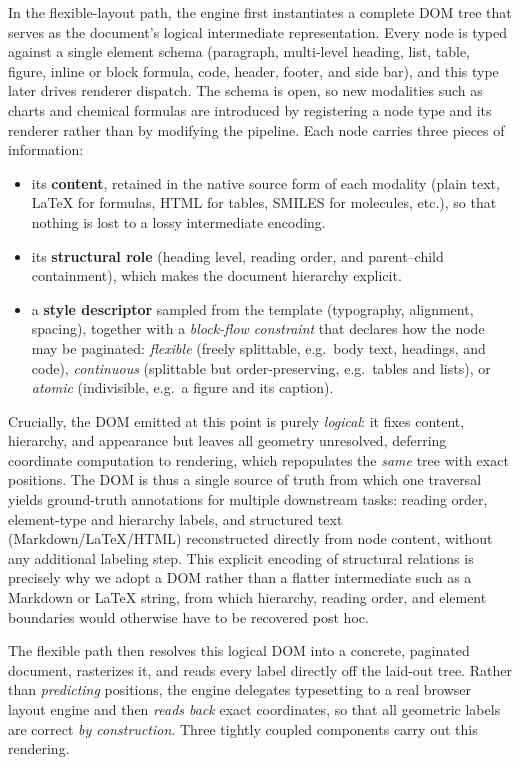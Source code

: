 In the flexible-layout path, the engine first instantiates a complete DOM tree that serves as the document's logical intermediate representation. Every node is typed against a single element schema (paragraph, multi-level heading, list, table, figure, inline or block formula, code, header, footer, and side bar), and this type later drives renderer dispatch. The schema is open, so new modalities such as charts and chemical formulas are introduced by registering a node type and its renderer rather than by modifying the pipeline. Each node carries three pieces of information:
\begin{itemize}[leftmargin=1.0em, labelsep=0.5em]
    \item its \textbf{content}, retained in the native source form of each modality (plain text, LaTeX for formulas, HTML for tables, SMILES for molecules, etc.), so that nothing is lost to a lossy intermediate encoding.
    \item its \textbf{structural role} (heading level, reading order, and parent--child containment), which makes the document hierarchy explicit.
    \item a \textbf{style descriptor} sampled from the template (typography, alignment, spacing), together with a \emph{block-flow constraint} that declares how the node may be paginated: \emph{flexible} (freely splittable, e.g.\ body text, headings, and code), \emph{continuous} (splittable but order-preserving, e.g.\ tables and lists), or \emph{atomic} (indivisible, e.g.\ a figure and its caption).
\end{itemize}

Crucially, the DOM emitted at this point is purely \emph{logical}: it fixes content, hierarchy, and appearance but leaves all geometry unresolved, deferring coordinate computation to rendering, which repopulates the \emph{same} tree with exact positions. The DOM is thus a single source of truth from which one traversal yields ground-truth annotations for multiple downstream tasks: reading order, element-type and hierarchy labels, and structured text (Markdown/LaTeX/HTML) reconstructed directly from node content, without any additional labeling step. This explicit encoding of structural relations is precisely why we adopt a DOM rather than a flatter intermediate such as a Markdown or LaTeX string, from which hierarchy, reading order, and element boundaries would otherwise have to be recovered post hoc.

The flexible path then resolves this logical DOM into a concrete, paginated document, rasterizes it, and reads every label directly off the laid-out tree. Rather than \emph{predicting} positions, the engine delegates typesetting to a real browser layout engine and then \emph{reads back} exact coordinates, so that all geometric labels are correct \emph{by construction}. Three tightly coupled components carry out this rendering.

